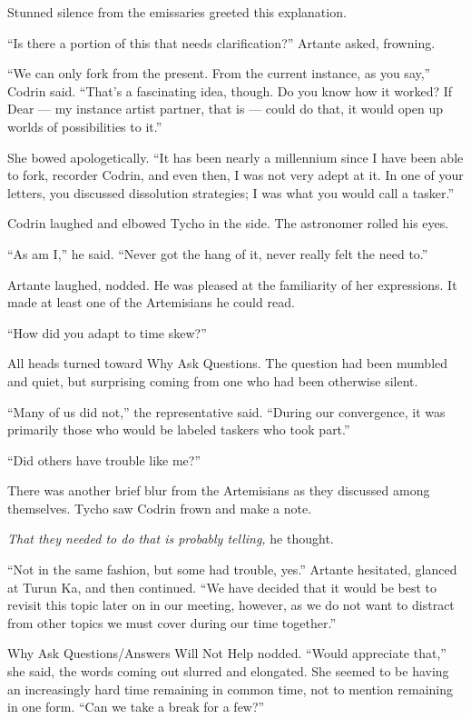 Stunned silence from the emissaries greeted this explanation.

``Is there a portion of this that needs clarification?'' Artante asked, frowning.

``We can only fork from the present. From the current instance, as you say,'' Codrin said. ``That's a fascinating idea, though. Do you know how it worked? If Dear — my instance artist partner, that is — could do that, it would open up worlds of possibilities to it.''

She bowed apologetically. ``It has been nearly a millennium since I have been able to fork, recorder Codrin, and even then, I was not very adept at it. In one of your letters, you discussed dissolution strategies; I was what you would call a tasker.''

Codrin laughed and elbowed Tycho in the side. The astronomer rolled his eyes.

``As am I,'' he said. ``Never got the hang of it, never really felt the need to.''

Artante laughed, nodded. He was pleased at the familiarity of her expressions. It made at least one of the Artemisians he could read.

``How did you adapt to time skew?''

All heads turned toward Why Ask Questions. The question had been mumbled and quiet, but surprising coming from one who had been otherwise silent.

``Many of us did not,'' the representative said. ``During our convergence, it was primarily those who would be labeled taskers who took part.''

``Did others have trouble like me?''

There was another brief blur from the Artemisians as they discussed among themselves. Tycho saw Codrin frown and make a note.

\emph{That they needed to do that is probably telling,} he thought.

``Not in the same fashion, but some had trouble, yes.'' Artante hesitated, glanced at Turun Ka, and then continued. ``We have decided that it would be best to revisit this topic later on in our meeting, however, as we do not want to distract from other topics we must cover during our time together.''

Why Ask Questions/Answers Will Not Help nodded. ``Would appreciate that,'' she said, the words coming out slurred and elongated. She seemed to be having an increasingly hard time remaining in common time, not to mention remaining in one form. ``Can we take a break for a few?''

